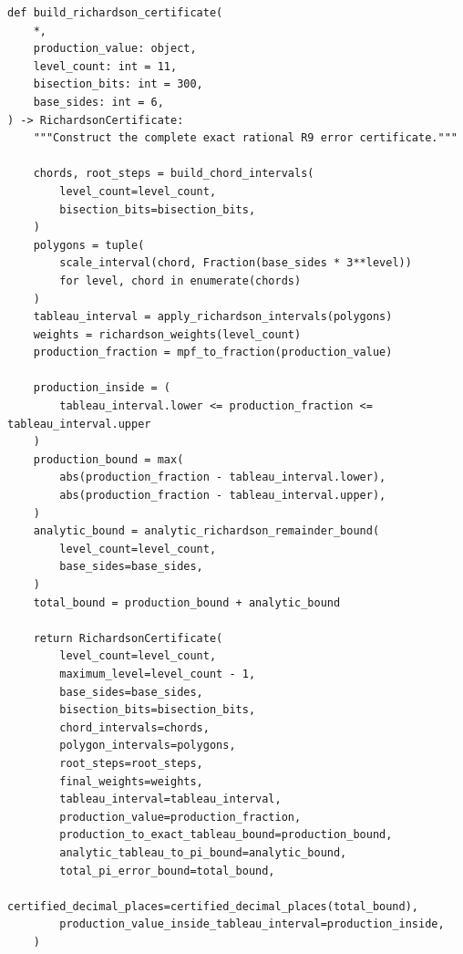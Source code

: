 \documentclass[11pt]{article}
\begin{document}
\begin{lstlisting}[style=pythonstyle,caption={Exact certification lane: \texttt{certified\_richardson.py}}]
def build_richardson_certificate(
    *,
    production_value: object,
    level_count: int = 11,
    bisection_bits: int = 300,
    base_sides: int = 6,
) -> RichardsonCertificate:
    """Construct the complete exact rational R9 error certificate."""

    chords, root_steps = build_chord_intervals(
        level_count=level_count,
        bisection_bits=bisection_bits,
    )
    polygons = tuple(
        scale_interval(chord, Fraction(base_sides * 3**level))
        for level, chord in enumerate(chords)
    )
    tableau_interval = apply_richardson_intervals(polygons)
    weights = richardson_weights(level_count)
    production_fraction = mpf_to_fraction(production_value)

    production_inside = (
        tableau_interval.lower <= production_fraction <= tableau_interval.upper
    )
    production_bound = max(
        abs(production_fraction - tableau_interval.lower),
        abs(production_fraction - tableau_interval.upper),
    )
    analytic_bound = analytic_richardson_remainder_bound(
        level_count=level_count,
        base_sides=base_sides,
    )
    total_bound = production_bound + analytic_bound

    return RichardsonCertificate(
        level_count=level_count,
        maximum_level=level_count - 1,
        base_sides=base_sides,
        bisection_bits=bisection_bits,
        chord_intervals=chords,
        polygon_intervals=polygons,
        root_steps=root_steps,
        final_weights=weights,
        tableau_interval=tableau_interval,
        production_value=production_fraction,
        production_to_exact_tableau_bound=production_bound,
        analytic_tableau_to_pi_bound=analytic_bound,
        total_pi_error_bound=total_bound,
        certified_decimal_places=certified_decimal_places(total_bound),
        production_value_inside_tableau_interval=production_inside,
    )
\end{lstlisting}
\end{document}
